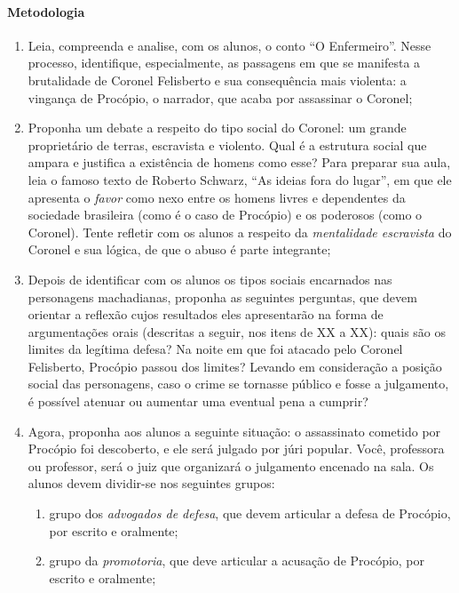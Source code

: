 \documentclass[11pt]{extarticle}
\begin{document}
\paragraph{Metodologia}
\begin{enumerate}
\item Leia, compreenda e analise, com os alunos, o conto ``O Enfermeiro''.
Nesse processo, identifique, especialmente, as passagens em que se
manifesta a brutalidade de Coronel Felisberto e sua consequência mais
violenta: a vingança de Procópio, o narrador, que acaba por assassinar o
Coronel;

\item Proponha um debate a respeito do tipo social do Coronel: um grande
proprietário de terras, escravista e violento. Qual é a estrutura social
que ampara e justifica a existência de homens como esse? Para preparar
sua aula, leia o famoso texto de Roberto Schwarz, ``As ideias fora do
lugar'', em que ele apresenta o \emph{favor} como nexo entre os homens
livres e dependentes da sociedade brasileira (como é o caso de Procópio)
e os poderosos (como o Coronel). Tente refletir com os alunos a respeito
da \emph{mentalidade escravista} do Coronel e sua lógica, de que o abuso
é parte integrante;

\item Depois de identificar com os alunos os tipos sociais encarnados nas
personagens machadianas, proponha as seguintes perguntas, que devem
orientar a reflexão cujos resultados eles apresentarão na forma de
argumentações orais (descritas a seguir, nos itens de XX a XX): quais
são os limites da legítima defesa? Na noite em que foi atacado pelo
Coronel Felisberto, Procópio passou dos limites? Levando em consideração
a posição social das personagens, caso o crime se tornasse público e
fosse a julgamento, é possível atenuar ou aumentar uma eventual pena a
cumprir?

\item Agora, proponha aos alunos a seguinte situação: o assassinato
cometido por Procópio foi descoberto, e ele será julgado por júri
popular. Você, professora ou professor, será o juiz que organizará o
julgamento encenado na sala. Os alunos devem dividir-se nos seguintes
grupos:

\begin{enumerate}
\item grupo dos \emph{advogados de defesa}, que devem articular a defesa de
Procópio, por escrito e oralmente;

\item grupo da \emph{promotoria}, que deve articular a acusação de
Procópio, por escrito e oralmente;


\end{enumerate}
\end{enumerate}
\end{document}

